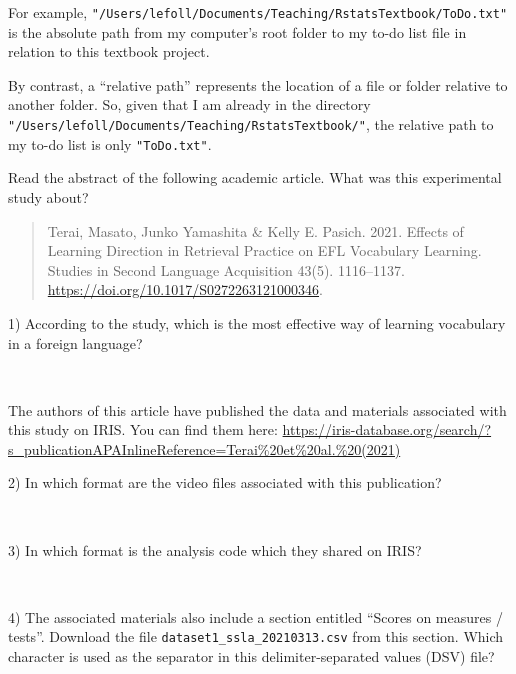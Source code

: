 \documentclass[
  letterpaper,
  DIV=11,
  numbers=noendperiod]{scrreprt}
\begin{document}
For example,
\texttt{"/Users/lefoll/Documents/Teaching/RstatsTextbook/ToDo.txt"} is
the absolute path from my computer's root folder to my to-do list file
in relation to this textbook project.

By contrast, a ``relative path'' represents the location of a file or
folder relative to another folder. So, given that I am already in the
directory \texttt{"/Users/lefoll/Documents/Teaching/RstatsTextbook/"},
the relative path to my to-do list is only \texttt{"ToDo.txt"}.

\begin{tcolorbox}[enhanced jigsaw, colbacktitle=quarto-callout-caution-color!10!white, titlerule=0mm, toptitle=1mm, breakable, rightrule=.15mm, toprule=.15mm, leftrule=.75mm, colframe=quarto-callout-caution-color-frame, arc=.35mm, colback=white, left=2mm, opacityback=0, opacitybacktitle=0.6, coltitle=black, bottomtitle=1mm, title=\textcolor{quarto-callout-caution-color}{\faFire}\hspace{0.5em}{Task}, bottomrule=.15mm]

Read the abstract of the following academic article. What was this
experimental study about?

\begin{quote}
Terai, Masato, Junko Yamashita \& Kelly E. Pasich. 2021. Effects of
Learning Direction in Retrieval Practice on EFL Vocabulary Learning.
Studies in Second Language Acquisition 43(5). 1116--1137.
\url{https://doi.org/10.1017/S0272263121000346}.
\end{quote}

1) According to the study, which is the most effective way of learning
vocabulary in a foreign language?

~

The authors of this article have published the data and materials
associated with this study on IRIS. You can find them here:
\url{https://iris-database.org/search/?s_publicationAPAInlineReference=Terai\%20et\%20al.\%20(2021)}

2) In which format are the video files associated with this publication?

~

3) In which format is the analysis code which they shared on IRIS?

~

4) The associated materials also include a section entitled ``Scores on
measures / tests''. Download the file
\texttt{dataset1\_ssla\_20210313.csv} from this section. Which character
is used as the separator in this delimiter-separated values (DSV) file?

\end{tcolorbox}
\end{document}

